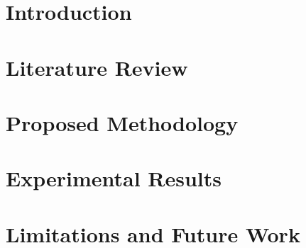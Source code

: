 \documentclass[12pt,a4paper]{report}
\begin{document}
\chapter{Introduction}


\chapter{Literature Review}


\chapter{Proposed Methodology}


\chapter{Experimental Results}


\chapter{Limitations and Future Work}


\clearpage



\onehalfspacing
{}
\renewcommand{\bibname}{References}










\end{document}
